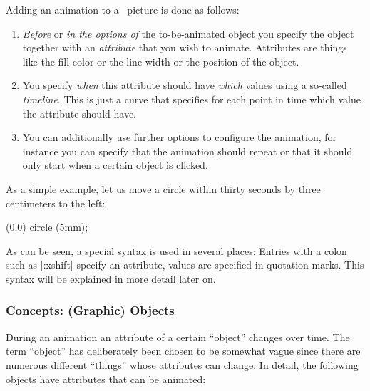 Adding an animation to a \tikzname\ picture is done as follows:

\begin{enumerate}
\item \emph{Before} or \emph{in the options of} the to-be-animated
  object you specify the object together with an \emph{attribute}
  that you wish to animate. Attributes are things like the fill color
  or the line width or the position of the object.
\item You specify \emph{when} this attribute should have \emph{which}
  values using a so-called \emph{timeline}. This is just a curve that
  specifies for each point in time which value the attribute should
  have.
\item You can additionally use further options to configure
  the animation, for instance you can specify that the animation
  should repeat or that it should only start when a certain object is
  clicked. 
\end{enumerate}

As a simple example, let us move a circle within thirty seconds by three
centimeters to the left:

\begin{codeexample}[width=2cm]
\tikz \draw [animate me = {:xshift = {0s = "0cm", 30s = "-3cm"}}] (0,0) circle (5mm);
\end{codeexample}

As can be seen, a special syntax is used in several places: Entries
with a colon such as |:xshift| specify an attribute, values
are specified in quotation marks. This syntax will be explained in 
more detail later on. 


\subsubsection{Concepts: (Graphic) Objects}

During an animation an attribute of a certain ``object''
changes over time. The term ``object'' has deliberately been chosen to
be somewhat vague since there are numerous different ``things'' whose
attributes can change. In detail, the following objects have
attributes that can be animated:

